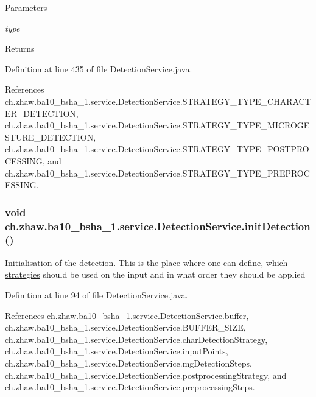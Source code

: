 \begin{DoxyParams}{Parameters}
\item[{\em type}]\end{DoxyParams}
\begin{DoxyReturn}{Returns}

\end{DoxyReturn}


Definition at line 435 of file DetectionService.java.

References ch.zhaw.ba10\_\-bsha\_\-1.service.DetectionService.STRATEGY\_\-TYPE\_\-CHARACTER\_\-DETECTION, ch.zhaw.ba10\_\-bsha\_\-1.service.DetectionService.STRATEGY\_\-TYPE\_\-MICROGESTURE\_\-DETECTION, ch.zhaw.ba10\_\-bsha\_\-1.service.DetectionService.STRATEGY\_\-TYPE\_\-POSTPROCESSING, and ch.zhaw.ba10\_\-bsha\_\-1.service.DetectionService.STRATEGY\_\-TYPE\_\-PREPROCESSING.\hypertarget{classch_1_1zhaw_1_1ba10__bsha__1_1_1service_1_1DetectionService_a0b70bd7c8703ca40307ec7cfb79c4c87}{
\subsubsection[{initDetection}]{\setlength{\rightskip}{0pt plus 5cm}void ch.zhaw.ba10\_\-bsha\_\-1.service.DetectionService.initDetection ()}}
\label{classch_1_1zhaw_1_1ba10__bsha__1_1_1service_1_1DetectionService_a0b70bd7c8703ca40307ec7cfb79c4c87}
Initialisation of the detection. This is the place where one can define, which \hyperlink{namespacech_1_1zhaw_1_1ba10__bsha__1_1_1strategies}{strategies} should be used on the input and in what order they should be applied 

Definition at line 94 of file DetectionService.java.

References ch.zhaw.ba10\_\-bsha\_\-1.service.DetectionService.buffer, ch.zhaw.ba10\_\-bsha\_\-1.service.DetectionService.BUFFER\_\-SIZE, ch.zhaw.ba10\_\-bsha\_\-1.service.DetectionService.charDetectionStrategy, ch.zhaw.ba10\_\-bsha\_\-1.service.DetectionService.inputPoints, ch.zhaw.ba10\_\-bsha\_\-1.service.DetectionService.mgDetectionSteps, ch.zhaw.ba10\_\-bsha\_\-1.service.DetectionService.postprocessingStrategy, and ch.zhaw.ba10\_\-bsha\_\-1.service.DetectionService.preprocessingSteps.

